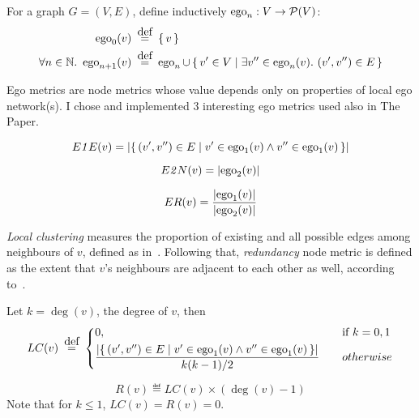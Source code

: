 \begin{definition}
    For a graph $G = (V, E)$, define inductively $\operatorname{ego}_n : V \rightarrow \mathcal{P}(V)$:
    \begin{align*}
        \ego_0(v) &\eqdef \left\{\, v \, \right\} \\
        \forall n \in \mathbb{N}.\ \ego_{n+1} (v) &\eqdef \ego_n \cup \Set{v' \in V}{ \exists v'' \in \ego_n(v).\ (v', v'') \in E }
    \end{align*}
\end{definition}

Ego metrics are node metrics whose value depends only on properties of local ego network(s).
I chose and implemented 3 interesting ego metrics used also in The Paper.

\noindent
\begin{minipage}{0.73\linewidth}
    \begin{definition}
        \vspace*{-5mm}\noindent
        \[ E\mathit{1}E (v) = \left\lvert \left\{\, (v', v'') \in E \mid  v' \in \operatorname{ego}_1(v) \wedge v'' \in \operatorname{ego}_1(v)  \, \right\} \right\rvert \]
    \end{definition}
    \begin{definition}
        \vspace*{-5mm}
        \[ E\mathit{2}N (v) = \left\lvert \operatorname{ego}_2(v) \right\rvert \]
    \end{definition}
    \begin{definition}
        \vspace*{-5mm}
        \[ ER(v) = \frac{ \left\lvert \operatorname{ego}_1(v) \right\rvert }{ \left\lvert \operatorname{ego}_2(v) \right\rvert } \]
    \end{definition}
\end{minipage}\hfill%
\begin{minipage}{0.23\linewidth}
    
\end{minipage}

\textsl{Local clustering} measures the proportion of existing and all possible edges among neighbours of $v$, defined as in~\cite{WattsCollectiveDynamicsSmallworld1998}.
Following that, \textsl{redundancy} node metric is defined as the extent that $v$'s neighbours are adjacent to each other as well, according to~\cite{borgatti1997structural}.
\begin{definition}
    \vspace*{-2mm}
    Let $k = \deg(v)$, the degree of $v$, then
    \[
        LC(v) \eqdef
        \begin{dcases}
            0, &\text{if } k = 0,1 \\
            \frac{ \left\lvert \Set{ (v', v'') \in E }{ v' \in \ego_1(v) \wedge v'' \in \ego_1(v) } \right\rvert }{ k (k-1) / 2 } \quad &otherwise
        \end{dcases}
    \]
\end{definition}
\begin{definition}[Redundancy]
    \[ R(v) \eqdef LC (v) \times (\deg(v) - 1) \]
    Note that for $k \leq 1$, $LC(v) = R(v) = 0$.
\end{definition}

